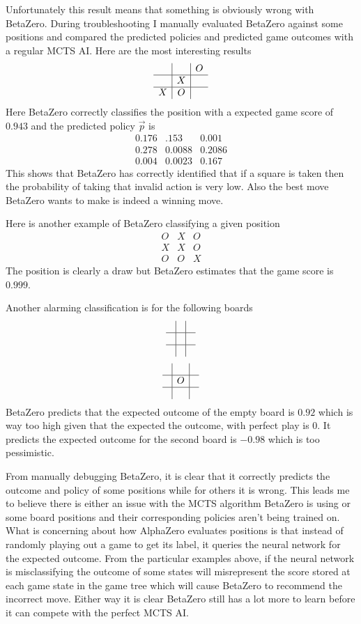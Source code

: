 \documentclass[letterpaper]{article} %
\begin{document}
  Unfortunately this result means that something is obviously wrong with
  BetaZero. During troubleshooting I manually evaluated BetaZero against some
  positions and compared the predicted policies and predicted game outcomes with
  a regular MCTS AI. Here are the most interesting results
  \[\begin{array}{c|c|c} & & O \\\hline & X & \\\hline X & O &\end{array}\]
  Here BetaZero correctly classifies the position with a expected game score of
  $0.943$ and the predicted policy $\vec{p}$ is
  \[\begin{array}{c|c|c}0.176 & .153 & 0.001 \\\hline 0.278 & 0.0088 & 0.2086
  \\\hline 0.004 & 0.0023 & 0.167\end{array}\]
  This shows that BetaZero has correctly identified that if a square is taken
  then the probability of taking that invalid action is very low. Also the best
  move BetaZero wants to make is indeed a winning move.

  Here is another example of BetaZero classifying a given position
  \[\begin{array}{c|c|c} O & X & O \\\hline X & X & O\\\hline O & O &
  X\end{array}\]
  The position is clearly a draw but BetaZero estimates that the game score is
  $0.999$.

  Another alarming classification is for the following boards
  \[\begin{array}{c|c|c} & &  \\\hline &  & \\\hline  &  &\end{array}\]
  \[\begin{array}{c|c|c} & &  \\\hline & O & \\\hline  &  &\end{array}\]
  BetaZero predicts that the expected outcome of the empty board is $0.92$ which
  is way too high given that the expected the outcome, with perfect play is $0$.
  It predicts the expected outcome for the second board is $-0.98$ which is too
  pessimistic.

  From manually debugging BetaZero, it is clear that it correctly predicts the
  outcome and policy of some positions while for others it is wrong. This leads
  me to believe there is either an issue with the MCTS algorithm BetaZero is
  using or some board positions and their corresponding policies aren't being
  trained on. What is concerning about how AlphaZero evaluates positions is that
  instead of randomly playing out a game to get its label, it queries the neural
  network for the expected outcome. From the particular examples above, if the
  neural network is misclassifying the outcome of some states will misrepresent
  the score stored at each game state in the game tree which will cause BetaZero
  to recommend the incorrect move. Either way it is clear BetaZero still has a
  lot more to learn before it can compete with the perfect MCTS AI.
\end{document}
